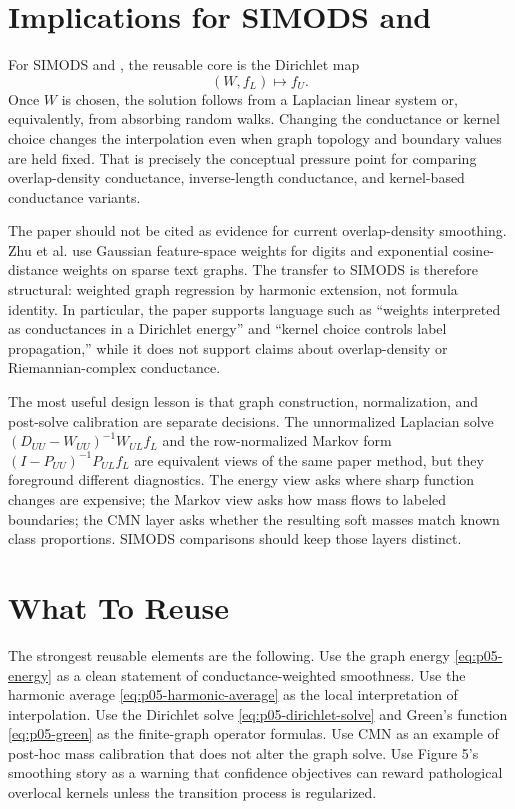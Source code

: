 \documentclass[11pt]{article}
\begin{document}
\section{Implications for SIMODS and }

For SIMODS and , the reusable core is the Dirichlet map
\[
  (W,f_L)\mapsto f_U.
\]
Once \(W\) is chosen, the solution follows from a Laplacian linear system or,
equivalently, from absorbing random walks. Changing the conductance or kernel
choice changes the interpolation even when graph topology and boundary values
are held fixed. That is precisely the conceptual pressure point for comparing
overlap-density conductance, inverse-length conductance, and kernel-based
conductance variants.

The paper should not be cited as evidence for current
 overlap-density smoothing. Zhu et al. use
Gaussian feature-space weights for digits and exponential cosine-distance
weights on sparse text graphs. The transfer to SIMODS is therefore structural:
weighted graph regression by harmonic extension, not formula identity. In
particular, the paper supports language such as ``weights interpreted as
conductances in a Dirichlet energy'' and ``kernel choice controls label
propagation,'' while it does not support claims about overlap-density or
Riemannian-complex conductance.

The most useful design lesson is that graph construction, normalization, and
post-solve calibration are separate decisions. The unnormalized Laplacian solve
\((D_{UU}-W_{UU})^{-1}W_{UL}f_L\) and the row-normalized Markov form
\((I-P_{UU})^{-1}P_{UL}f_L\) are equivalent views of the same paper method, but
they foreground different diagnostics. The energy view asks where sharp
function changes are expensive; the Markov view asks how mass flows to labeled
boundaries; the CMN layer asks whether the resulting soft masses match known
class proportions. SIMODS comparisons should keep those layers distinct.

\section{What To Reuse}

The strongest reusable elements are the following. Use the graph energy
\eqref{eq:p05-energy} as a clean statement of conductance-weighted smoothness.
Use the harmonic average \eqref{eq:p05-harmonic-average} as the local
interpretation of interpolation. Use the Dirichlet solve
\eqref{eq:p05-dirichlet-solve} and Green's function \eqref{eq:p05-green} as the
finite-graph operator formulas. Use CMN as an example of post-hoc mass
calibration that does not alter the graph solve. Use Figure 5's smoothing story
as a warning that confidence objectives can reward pathological overlocal
kernels unless the transition process is regularized.
\end{document}
